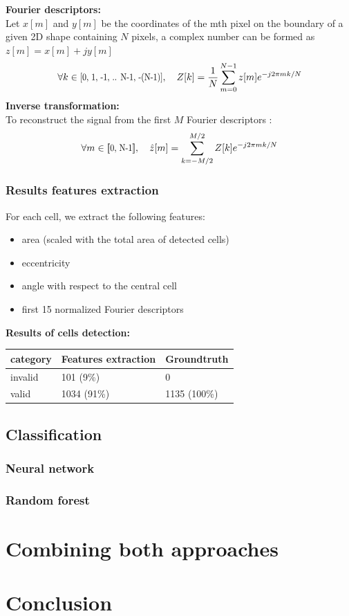 \documentclass[a4paper]{article}
\begin{document}
\noindent\textbf{Fourier descriptors:}\\
    Let $x[m]$ and $y[m]$ be the coordinates of the mth pixel on the boundary of a given 2D shape containing $N$ pixels, a complex number can be formed as  $z[m]=x[m]+jy[m]$\\
    $$\forall k \in\scalebox{0.85}[1.0]{[0, 1, -1, .. N-1, -(N-1)]}, \quad Z[k] = \frac{1}{N}\displaystyle\sum_{m=0}^{N-1} z[m]e^{-j2\pi mk/N}$$
\textbf{Inverse transformation:}\\
To reconstruct the signal from the first $M$ Fourier descriptors :
    $$\forall m \in \scalebox{0.85}[1.0]{[\![0, N-1]\!]}, \quad \hat{z}[m] = \displaystyle\sum_{k=-M/2}^{M/2} Z[k]e^{-j2\pi mk/N}$$


\subsubsection{Results features extraction}
For each cell, we extract the following features:
    \begin{itemize}
        \item area (scaled with the total area of detected cells)
        \item eccentricity
        \item angle with respect to the central cell
        \item first 15 normalized Fourier descriptors
    \end{itemize}
    \vspace{3pt}
\large{\textbf{Results of cells detection:}}\\
    \vspace{15pt}
\begin{tabular}{ |m{2cm}|m{10em}|m{8em}| }
 \hline
category & Features extraction & Groundtruth \\
\hline
invalid & 101 (9\%) &  0\\
valid & 1034 (91\%)  & 1135 (100\%)\\
\hline
\end{tabular}

\newpage
\subsection{Classification}

\subsubsection{Neural network}
\subsubsection{Random forest}

\newpage
\section{Combining both approaches}

\newpage
\section{Conclusion}
\end{document}
